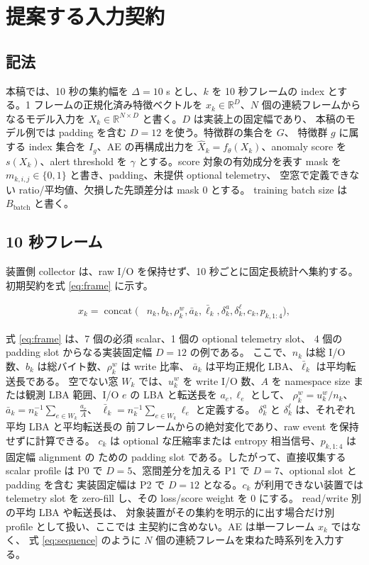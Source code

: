 \section{提案する入力契約}

\subsection{記法}

本稿では、10 秒の集約幅を $\Delta=10$ s とし、$k$ を 10 秒フレームの
index とする。1 フレームの正規化済み特徴ベクトルを
$x_k \in \mathbb{R}^{D}$、$N$ 個の連続フレームからなるモデル入力を
$X_k \in \mathbb{R}^{N \times D}$ と書く。$D$ は実装上の固定幅であり、
本稿のモデル例では padding を含む $D=12$ を使う。特徴群の集合を $G$、
特徴群 $g$ に属する index 集合を $I_g$、AE の再構成出力を
$\hat{X}_k=f_{\theta}(X_k)$、anomaly score を $s(X_k)$、alert threshold を
$\gamma$ とする。score 対象の有効成分を表す mask を
$m_{k,i,j}\in\{0,1\}$ と書き、padding、未提供 optional telemetry、
空窓で定義できない ratio/平均値、欠損した先頭差分は mask 0 とする。
training batch size は $B_{\mathrm{batch}}$ と書く。

\subsection{10 秒フレーム}

装置側 collector は、raw I/O を保持せず、10 秒ごとに固定長統計へ集約する。
初期契約を式 \eqref{eq:frame} に示す。

\begin{align}
  x_k = \operatorname{concat}(&n_k, b_k, \rho^w_k,
        \bar{a}_k, \bar{\ell}_k,
        \delta^a_k, \delta^\ell_k, c_k, p_{k,1:4}) ,
  \label{eq:frame}
\end{align}

式 \eqref{eq:frame} は、7 個の必須 scalar、1 個の optional telemetry slot、
4 個の padding slot からなる実装固定幅 $D=12$ の例である。
ここで、$n_k$ は総 I/O 数、$b_k$ は総バイト数、$\rho^w_k$ は write 比率、
$\bar{a}_k$ は平均正規化 LBA、$\bar{\ell}_k$ は平均転送長である。
空でない窓 $W_k$ では、$u^w_k$ を write I/O 数、$A$ を namespace size
または観測 LBA 範囲、I/O $e$ の LBA と転送長を $a_e,\ell_e$ として、
$\rho^w_k=u^w_k/n_k$、$\bar{a}_k=n_k^{-1}\sum_{e \in W_k}\frac{a_e}{A}$、
$\bar{\ell}_k=n_k^{-1}\sum_{e \in W_k}\ell_e$ と定義する。
$\delta^a_k$ と $\delta^\ell_k$ は、それぞれ平均 LBA と平均転送長の
前フレームからの絶対変化であり、raw event を保持せずに計算できる。
$c_k$ は optional な圧縮率または entropy 相当信号、$p_{k,1:4}$ は固定幅 alignment の
ための padding slot である。したがって、直接収集する scalar profile は P0 で
$D=5$、窓間差分を加える P1 で $D=7$、optional slot と padding を含む
実装固定幅は P2 で $D=12$ となる。$c_k$ が利用できない装置では
telemetry slot を zero-fill し、その loss/score weight を 0 にする。
read/write 別の平均 LBA や転送長は、
対象装置がその集約を明示的に出す場合だけ別 profile として扱い、ここでは
主契約に含めない。AE は単一フレーム $x_k$ ではなく、
式 \eqref{eq:sequence} のように
$N$ 個の連続フレームを束ねた時系列を入力する。

